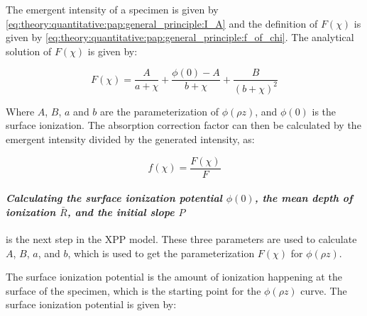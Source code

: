 The emergent intensity of a specimen is given by \cref{eq:theory:quantitative:pap:general_principle:I_A} and the definition of $F(\chi)$ is given by \cref{eq:theory:quantitative:pap:general_principle:f_of_chi}. The analytical solution of $F(\chi)$ is given by:



\begin{equation}
    \label{eq:theory:quantitative:pap:F_of_chi}
    F(\chi) = \frac{A}{a+ \chi} + \frac{\phi(0) - A}{b + \chi} + \frac{B}{(b + \chi)^2}
\end{equation}

Where $A$, $B$, $a$ and $b$ are the parameterization of $\phi(\rho z)$, and $\phi(0)$ is the surface ionization. 
The absorption correction factor can then be calculated by the emergent intensity divided by the generated intensity, as:

\begin{equation}
    \label{eq:theory:quantitative:pap:absorption_correction}
    f(\chi) = \frac{F(\chi)}{F}
\end{equation}







\paragraph*{\emph{Calculating the surface ionization potential $\phi(0)$, the mean depth of ionization $\bar{R}$, and the initial slope $P$}} is the next step in the XPP model.
These three parameters are used to calculate $A$, $B$, $a$, and $b$, which is used to get the parameterization $F(\chi)$ for $\phi(\rho z)$.


The surface ionization potential is the amount of ionization happening at the surface of the specimen, which is the starting point for the $\phi(\rho z)$ curve. The surface ionization potential is given by:

